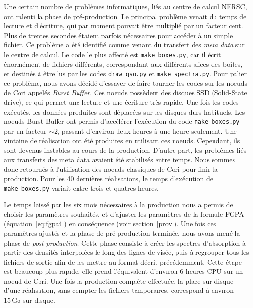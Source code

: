 \documentclass[11pt, twoside, a4paper, openright]{report}
\begin{document}
Une certain nombre de problèmes informatiques, liés au centre de calcul NERSC, ont ralenti la phase de pré-production. Le principal problème venait du temps de lecture et d'écriture, qui par moment pouvait être multiplié par un facteur cent. Plus de trentes secondes étaient parfois nécessaires pour accéder à un simple fichier. Ce problème a été identifié comme venant du transfert des \emph{meta data} sur le centre de calcul. Le code le plus affecté est \texttt{make\_boxes.py}, car il écrit énormément de fichiers différents, correspondant aux différents slices des boîtes, et destinés à être lus par les codes \texttt{draw\_qso.py} et \texttt{make\_spectra.py}. Pour palier ce problème, nous avons décidé d'essayer de faire tourner les codes sur les noeuds de Cori appelés \emph{Burst Buffer}. Ces noeuds possèdent des disques SSD (Solid-State drive), ce qui permet une lecture et une écriture très rapide. Une fois les codes exécutés, les données produites sont déplacées sur les disques durs habituels. Les noeuds Burst Buffer ont permis d'accélérer l'exécution du code \texttt{make\_boxes.py} par un facteur $\sim \num{2}$, passant d'environ deux heures à une heure seulement. Une vintaine de réalisation ont été produites en utilisant ces noeuds. Cependant, ils sont devenus instables au cours de la production. D'autre part, les problèmes liés aux transferts des meta data avaient été stabilisés entre temps. Nous sommes donc retournés à l'utilisation des noeuds classiques de Cori pour finir la production. Pour les 40 dernières réalisations, le temps d'exécution de \texttt{make\_boxes.py} variait entre trois et quatres heures.

Le temps laissé par les six mois nécessaires à la production nous a permis de choisir les paramètres \lya{} souhaités,
et d'ajuster les paramètres de la formule FGPA (équation~\ref{eq:fgpa4}) en conséquence (voir section~\ref{prov}). Une fois ces paramètres ajustés et la phase de pré-production terminée, nous avons mené la phase de \emph{post-production}. Cette phase consiste à créer les spectres d'absorption à partir des densités interpolées le long des lignes de visée, puis à regrouper tous les fichiers de sortie afin de les mettre au format décrit précédemment. Cette étape est beaucoup plus rapide, elle prend l'équivalent d'environ 6 heures CPU sur un noeud de Cori. Une fois la production complète effectuée, la place sur disque d'une réalisation, sans compter les fichiers temporaires, correspond à environ $\num{15}\,\mathrm{Go}$ sur disque.





\end{document}
